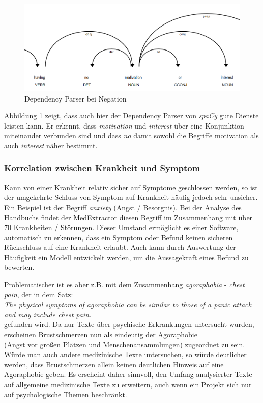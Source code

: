 \begin{figure}[h]
    \centering
    \includegraphics[width=\textwidth]{pictures/Dep_Parser_Negation.png}
    \caption{Dependency Parser bei Negation}
    \label{fig:negation}
\end{figure}

Abbildung \ref{fig:negation} zeigt, dass auch hier der Dependency Parser von \emph{spaCy} gute Dienste leisten kann. Er erkennt, dass \emph{motivation} und \emph{interest} über eine Konjunktion miteinander verbunden sind und dass \emph{no} damit sowohl die Begriffe {motivation} als auch \emph{interest} näher bestimmt.

\subsubsection{Korrelation zwischen Krankheit und Symptom}
\label{subsec: stigmatisierung} 

Kann von einer Krankheit relativ sicher auf Symptome geschlossen werden, so ist der umgekehrte Schluss von Symptom auf Krankheit häufig jedoch sehr unsicher. Ein Beispiel ist der Begriff \emph{anxiety} (Angst / Besorgnis). Bei der Analyse des Handbuchs findet der MedExtractor diesen Begriff im Zusammenhang mit über 70 Krankheiten / Störungen. Dieser Umstand ermöglicht es einer Software, automatisch zu erkennen, dass ein Symptom oder Befund keinen sicheren Rückschluss auf eine Krankheit erlaubt. Auch kann durch Auswertung der Häufigkeit ein Modell entwickelt werden, um die Aussagekraft eines Befund zu bewerten.

Problematischer ist es aber z.B. mit dem Zusammenhang \emph{agoraphobia} - \emph{chest pain}, der in dem Satz:\\

\emph{\glqq The physical symptoms of agoraphobia can be similar to those of a panic attack and may include chest pain.\grqq}\\

gefunden wird. Da nur Texte über psychische Erkrankungen untersucht wurden, erscheinen Brustschmerzen nun als eindeutig der Agoraphobie \\
(Angst vor großen Plätzen und Menschenansammlungen) zugeordnet zu sein. Würde man auch andere medizinische Texte untersuchen, so würde deutlicher werden, dass Brustschmerzen allein keinen deutlichen Hinweis auf eine Agoraphobie geben. Es erscheint daher sinnvoll, den Umfang analysierter Texte auf allgemeine medizinische Texte zu erweitern, auch wenn ein Projekt sich nur auf psychologische Themen beschränkt.

